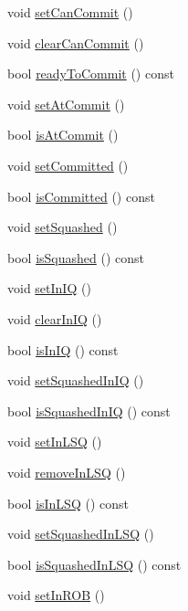 \begin{DoxyCompactItemize}
void \hyperlink{classBaseDynInst_a0cbc886f9978503b587b4d7a7e3db728}{setCanCommit} ()
\item 
void \hyperlink{classBaseDynInst_ad22bc2d91297685b76dc15215666883d}{clearCanCommit} ()
\item 
bool \hyperlink{classBaseDynInst_a0bfca6b2400cf8496f4e685668839861}{readyToCommit} () const 
\item 
void \hyperlink{classBaseDynInst_adef575a8b55171e005db4954a44e5caf}{setAtCommit} ()
\item 
bool \hyperlink{classBaseDynInst_a8b514343a000efa2bf568c4f964cb8b1}{isAtCommit} ()
\item 
void \hyperlink{classBaseDynInst_a101a00eca65e94adc1377989d88a3c99}{setCommitted} ()
\item 
bool \hyperlink{classBaseDynInst_a9cc760f9838c39bfb3112cdbfb468cf3}{isCommitted} () const 
\item 
void \hyperlink{classBaseDynInst_abfa7b30b342b5ef70b7e060b305a2f94}{setSquashed} ()
\item 
bool \hyperlink{classBaseDynInst_add8df091bd836cf92c6987990d130b83}{isSquashed} () const 
\item 
void \hyperlink{classBaseDynInst_a453f140409e14d608c78d1ed1e72fef7}{setInIQ} ()
\item 
void \hyperlink{classBaseDynInst_a0a7b38cc3c0a8ae3147bfbf3e29838ee}{clearInIQ} ()
\item 
bool \hyperlink{classBaseDynInst_a2edaf88f1e5d97e6785e1f17819bed40}{isInIQ} () const 
\item 
void \hyperlink{classBaseDynInst_ac9182e42b15715aae67ae9997da25082}{setSquashedInIQ} ()
\item 
bool \hyperlink{classBaseDynInst_aa2983ad327b9f2045350cc639d6e23bd}{isSquashedInIQ} () const 
\item 
void \hyperlink{classBaseDynInst_adba79e6ab3a1d6a3cc4157241830b086}{setInLSQ} ()
\item 
void \hyperlink{classBaseDynInst_a464c336cf798d9eec1f4bd8daf601fa5}{removeInLSQ} ()
\item 
bool \hyperlink{classBaseDynInst_ab1c7907423921c684177bb65bde913c2}{isInLSQ} () const 
\item 
void \hyperlink{classBaseDynInst_a1d30846da1d1b390304ec1092751c8e0}{setSquashedInLSQ} ()
\item 
bool \hyperlink{classBaseDynInst_a103500ce68cd17d86796ff2d6ecf1445}{isSquashedInLSQ} () const 
\item 
void \hyperlink{classBaseDynInst_a530dfc5f62fd422d1f4cc0e66074504e}{setInROB} ()

\end{DoxyCompactItemize}
